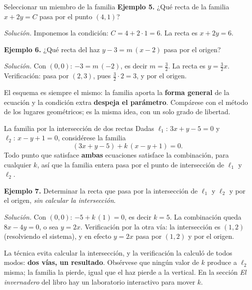 \documentclass[aspectratio=169,10pt]{beamer}
\newcommand{\destaca}[1]{%
  \par\vspace{3pt}\noindent
  \colorbox{turquesaClaro}{%
    \parbox{\dimexpr\linewidth-2\fboxsep\relax}{\vspace{3pt}#1\vspace{3pt}}}%
  \par\vspace{3pt}}
\begin{document}
\begin{frame}{Seleccionar un miembro de la familia}
  \textbf{Ejemplo 5.} ¿Qué recta de la familia $x+2y=C$ pasa por el
  punto $(4,1)$?

  \vspace{0.1cm}

  {\small \textit{Solución.} Imponemos la condición: $C=4+2\cdot 1=6$.
  La recta es $x+2y=6$.}

  \vspace{0.3cm}

  \textbf{Ejemplo 6.} ¿Qué recta del haz $y-3=m\,(x-2)$ pasa por el
  origen?

  \vspace{0.1cm}

  {\small \textit{Solución.} Con $(0,0)$: $-3=m\,(-2)$, es decir
  $m=\tfrac32$. La recta es $y=\tfrac32 x$. Verificación: pasa por
  $(2,3)$, pues $\tfrac32\cdot 2=3$, y por el origen. \checkmark}

  \vspace{0.3cm}
  \destaca{El esquema es siempre el mismo: la familia aporta la
  \textbf{forma general} de la ecuación y la condición extra
  \textbf{despeja el parámetro}. Compárese con el método de los
  lugares geométricos; es la misma idea, con un solo grado de
  libertad.}
\end{frame}
\begin{frame}{La familia por la intersección de dos rectas}
  Dadas $\ell_1:\,3x+y-5=0$ y $\ell_2:\,x-y+1=0$, considérese la
  familia
  \[
    (3x+y-5)+k\,(x-y+1)=0 .
  \]
  Todo punto que satisface \textbf{ambas} ecuaciones satisface la
  combinación, para cualquier $k$, así que la familia entera pasa por
  el punto de intersección de $\ell_1$ y $\ell_2$.

  \vspace{0.2cm}

  \textbf{Ejemplo 7.} Determinar la recta que pasa por la intersección
  de $\ell_1$ y $\ell_2$ y por el origen, \textit{sin calcular la
  intersección}.

  \vspace{0.1cm}

  {\small \textit{Solución.} Con $(0,0)$: $-5+k\,(1)=0$, es decir
  $k=5$. La combinación queda $8x-4y=0$, o sea $y=2x$.
  Verificación por la otra vía: la intersección es $(1,2)$ (resolviendo
  el sistema), y en efecto $y=2x$ pasa por $(1,2)$ y por el origen.
  \checkmark}

  \vspace{0.2cm}
  \destaca{\small La técnica evita calcular la intersección, y la
  verificación la calculó de todos modos: \textbf{dos vías, un
  resultado}. Obsérvese que ningún valor de $k$ produce a $\ell_2$
  misma; la familia la pierde, igual que el haz pierde a la vertical.
  En la sección \textit{El invernadero} del libro hay un laboratorio
  interactivo para mover $k$.}
\end{frame}
\end{document}
